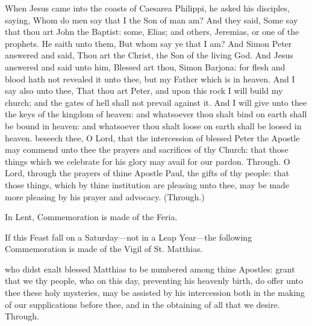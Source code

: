 
 When Jesus came into the coasts of Caesarea Philippi, he asked his disciples, saying, Whom do men say that I the Son of man am? And they said, Some say that thou art John the Baptist: some, Elias; and others, Jeremias, or one of the prophets. He saith unto them, But whom say ye that I am? And Simon Peter answered and said, Thou art the Christ, the Son of the living God. And Jesus answered and said unto him, Blessed art thou, Simon Barjona: for flesh and blood hath not revealed it unto thee, but my Father which is in heaven. And I say also unto thee, That thou art Peter, and upon this rock I will build my church; and the gates of hell shall not prevail against it. And I will give unto thee the keys of the kingdom of heaven: and whatsoever thou shalt bind on earth shall be bound in heaven: and whatsoever thou shalt loose on earth shall be loosed in heaven.
\secret
{} beseech thee, O Lord, that the intercession of blessed Peter the Apostle may commend unto thee the prayers and sacrifices of thy Church: that those things which we celebrate for his glory may avail for our pardon. Through.
 O Lord, through the prayers of thine Apostle Paul, the gifts of thy people: that those things, which by thine institution are pleasing unto thee, may be made more pleasing by his prayer and advocacy. (Through.)
\begin{rubric}
    In Lent, Commemoration is made of the Feria.%
\end{rubric}
\begin{rubric}
    If this Feast fall on a Saturday---not in a Leap Year---the following Commemoration is made of the Vigil of St. Matthias.
\end{rubric}
 who didst exalt blessed Matthias to be numbered among thine Apostles: grant that we thy people, who on this day, preventing his heavenly birth, do offer unto thee these holy mysteries, may be assisted by his intercession both in the making of our supplications before thee, and in the obtaining of all that we desire. Through.

